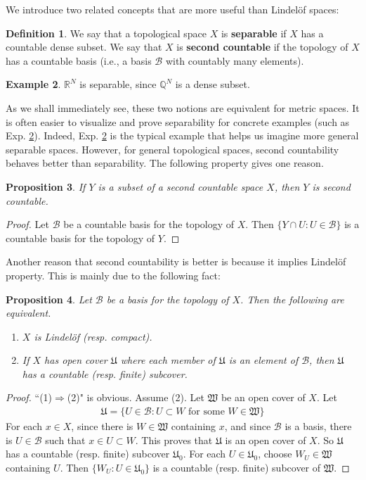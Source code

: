 \documentclass[12pt,b5paper,notitlepage]{article}
\theoremstyle{definition}
\newtheorem{df}{Definition}[section]
\newtheorem{eg}[df]{Example}
\theoremstyle{plain}
\newtheorem{pp}[df]{Proposition}
\newcommand{\fk}{\mathfrak}
\newcommand{\mc}{\mathcal}
\newcommand{\Qbb}{\mathbb Q}
\newcommand{\Rbb}{\mathbb R}
\numberwithin{equation}{section}
\begin{document}
We introduce two related concepts that are more useful than Lindel\"of spaces:
\begin{df}
We say that a topological space $X$ is \textbf{separable}  if $X$ has a countable dense subset. We say that $X$ is \textbf{second countable}  if the topology of $X$ has a countable basis (i.e., a basis $\mc B$ with countably many elements).
\end{df}

\begin{eg}\label{lb248}
$\Rbb^N$ is separable, since $\Qbb^N$ is a dense subset. 
\end{eg}


As we shall immediately see, these two notions are equivalent for metric spaces. It is often easier to visualize and prove separability for concrete examples (such as Exp. \ref{lb248}). Indeed, Exp. \ref{lb248} is the typical example that helps us imagine more general separable spaces. However, for general topological spaces, second countability behaves better than separability.  The following property gives one reason.
\begin{pp}
If $Y$ is a subset of a second countable space $X$, then $Y$ is second countable.
\end{pp}

\begin{proof}
Let $\mc B$ be a countable basis for the topology of $X$. Then $\{Y\cap U:U\in\mc B\}$ is a countable basis for the topology of $Y$.
\end{proof}
Another reason that second countability is better is because it implies Lindel\"of property. This is mainly due to the following fact:

\begin{pp}\label{lb249}
Let $\mc B$ be a basis for the topology of $X$. Then the following are equivalent.
\begin{enumerate}[label=(\arabic*)]
\item $X$ is Lindel\"of (resp. compact).
\item If $X$ has open cover $\fk U$ where each member of $\fk U$ is an element of $\mc B$, then $\fk U$ has a countable (resp. finite) subcover.
\end{enumerate}
\end{pp}

\begin{proof}
``(1)$\Rightarrow$(2)" is obvious.  Assume (2). Let $\fk W$ be an open cover of $X$. Let
\begin{align*}
\fk U=\{U\in \mc B:U\subset W\text{ for some }W\in\fk W\}
\end{align*} 
For each $x\in X$, since there is $W\in\fk W$ containing $x$, and since $\mc B$ is a basis, there is $U\in\mc B$ such that $x\in U\subset W$. This proves that $\fk U$ is an open cover of $X$. So $\fk U$ has a countable (resp. finite) subcover $\fk U_0$. For each $U\in\fk U_0$, choose $W_U\in\fk W$ containing $U$. Then $\{W_U:U\in\fk U_0\}$ is a countable (resp. finite) subcover of $\fk W$.
\end{proof}
\end{document}
